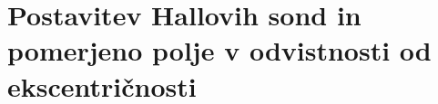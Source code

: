 \section{Postavitev Hallovih sond in pomerjeno polje v odvistnosti od ekscentričnosti}
%
%
%
%
%
%
%
%
%
%


